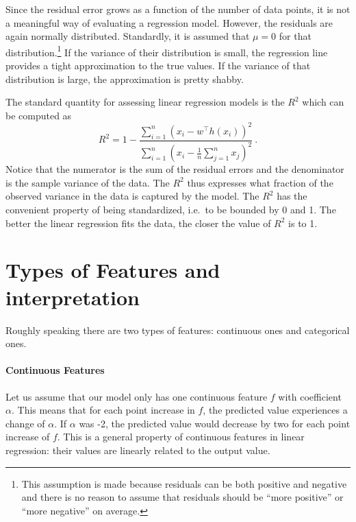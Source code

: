 \documentclass[11pt, leqno, a4paper]{article}
\begin{document}
Since the residual error grows as a function of the number of data points, it is not a meaningful
way of evaluating a regression model. However, the residuals are again normally distributed. Standardly,
it is assumed that $ \mu=0 $ for that distribution.\footnote{This assumption is made because
residuals can be both positive and negative and there is no reason to assume that residuals should
be ``more positive'' or ``more negative'' on average.} If the
variance of their distribution is small, the regression line provides a tight approximation to the
true values. If the variance of that distribution is large, the approximation is pretty shabby. 

The standard quantity for assessing linear regression models is the 
\href{https://en.wikipedia.org/wiki/Coefficient_of_determination}{$ R^{2} $} which can be computed as
\begin{equation}
R^{2} = 1 - \frac{\sum_{i=1}^{n} \left( x_{i} - w^{\top}h(x_{i}) \right)^{2}}
{\sum_{i=1}^{n} \left(x_{i} - \frac{1}{n}\sum_{j = 1}^{n}x_{j}\right)^{2}} \ .
\end{equation}
Notice that the numerator is the sum of the residual errors 
and the denominator is the sample variance of the data.
The $ R^{2} $ thus expresses what fraction of the observed variance in the data is captured by the model. The 
$ R^{2} $ has the convenient property of being standardized, i.e.\ to
be bounded by 0 and 1. The better the linear regression fits the data,
the closer the value of $R^2$ is to 1.



\section{Types of Features and interpretation}

Roughly speaking there are two types of features: continuous ones and categorical ones.

\paragraph{Continuous Features} Let us assume that our model only has one continuous feature $ f $ 
with coefficient $ \alpha $. This means that for each point increase in $ f $, the predicted value
experiences a change of $ \alpha $. If $ \alpha $ was -2, the predicted value would decrease by two
for each point increase of $ f $. This is a general property of continuous features in linear
regression: their values are linearly related to the output value.
\end{document}
